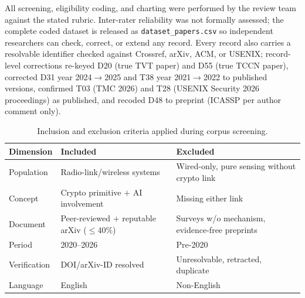 All screening, eligibility coding, and charting were performed by the review team against the stated rubric. Inter-rater reliability was not formally assessed; the complete coded dataset is released as \texttt{dataset\_papers.csv} so independent researchers can check, correct, or extend any record. Every record also carries a resolvable identifier checked against Crossref, arXiv, ACM, or USENIX; record-level corrections re-keyed D20 (true TVT paper) and D55 (true TCCN paper), corrected D31 year 2024$\rightarrow$2025 and T38 year 2021$\rightarrow$2022 to published versions, confirmed T03 (TMC 2026) and T28 (USENIX Security 2026 proceedings) as published, and recoded D48 to preprint (ICASSP per author comment only).

\begin{table}[tbp]
\centering
\caption{Inclusion and exclusion criteria applied during corpus screening.}
\label{tab:criteria}
\begin{tabular}{@{}p{2.2cm} p{5.5cm} p{6.0cm}@{}}
\toprule
Dimension & Included & Excluded \\
\midrule
Population & Radio-link/wireless systems & Wired-only, pure sensing without crypto link \\
Concept & Crypto primitive $+$ AI involvement & Missing either link \\
Document & Peer-reviewed $+$ reputable arXiv ($\le$40\%) & Surveys w/o mechanism, evidence-free preprints \\
Period & 2020--2026 & Pre-2020 \\
Verification & DOI/arXiv-ID resolved & Unresolvable, retracted, duplicate \\
Language & English & Non-English \\
\bottomrule
\end{tabular}
\end{table}

